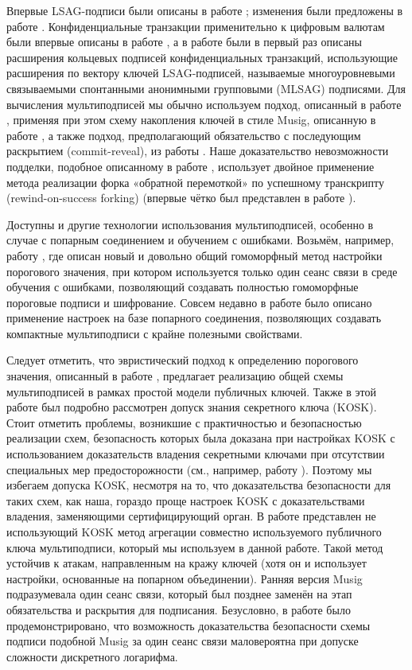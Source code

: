 \documentclass{mrl}
\theoremstyle{definition}
\numberwithin{theorem}{subsection}
\begin{document}
Впервые LSAG-подписи были описаны в работе \cite{liu2004linkable}; изменения были предложены в работе \cite{backLSAG}.
Конфиденциальные транзакции применительно к цифровым валютам были впервые описаны в работе \cite{maxwell2015confidential}, а в работе \cite{noether2016ring} были в первый раз описаны расширения кольцевых подписей конфиденциальных транзакций, использующие расширения по вектору ключей LSAG-подписей, называемые многоуровневыми связываемыми спонтанными анонимными групповыми (MLSAG) подписями. Для вычисления мультиподписей мы обычно используем подход, описанный в работе \cite{bellare2006multi}, применяя при этом схему накопления ключей в стиле Musig, описанную в работе \cite{qian2010non}, а также подход, предполагающий обязательство с последующим раскрытием (commit-reveal), из работы \cite{maxwell2018simple}. Наше доказательство невозможности подделки, подобное описанному в работе \cite{maxwell2018simple}, использует двойное применение метода реализации форка «обратной перемоткой» по успешному транскрипту (rewind-on-success forking) (впервые чётко был представлен в работе \cite{liu2004linkable}).

Доступны и другие технологии использования мультиподписей, особенно в случае с попарным соединением и обучением с ошибками. Возьмём, например, работу \cite{bonehthreshold}, где описан новый и довольно общий гомоморфный метод настройки порогового значения, при котором используется только один сеанс связи в среде обучения с ошибками, позволяющий создавать полностью гомоморфные пороговые подписи и шифрование. Совсем недавно в работе \cite{bonehcompact} было описано применение настроек на базе попарного соединения, позволяющих создавать компактные мультиподписи с крайне полезными свойствами.

Следует отметить, что эвристический подход к определению порогового значения, описанный в работе \cite{bellare2006multi}, предлагает реализацию общей схемы мультиподписей в рамках простой модели публичных ключей. Также в этой работе был подробно рассмотрен допуск знания секретного ключа (KOSK). Стоит отметить проблемы, возникшие с практичностью и безопасностью реализации схем, безопасность которых была доказана при настройках KOSK с использованием доказательств владения секретными ключами при отсутствии специальных мер предосторожности (см., например, работу \cite{ristenpart2007power}). Поэтому мы избегаем допуска KOSK, несмотря на то, что доказательства безопасности для таких схем, как наша, гораздо проще настроек KOSK с доказательствами владения, заменяющими сертифицирующий орган. В работе \cite{qian2010non} представлен не использующий KOSK метод агрегации совместно используемого публичного ключа мультиподписи, который мы используем в данной работе. Такой метод устойчив к атакам, направленным на кражу ключей (хотя он и использует настройки, основанные на попарном объединении). Ранняя версия Musig подразумевала один сеанс связи, который был позднее заменён на этап обязательства и раскрытия для подписания. Безусловно, в работе \cite{drijvers2018okamoto} было продемонстрировано, что возможность доказательства безопасности схемы подписи подобной Musig за один сеанс связи маловероятна при допуске сложности дискретного логарифма.
\end{document}
